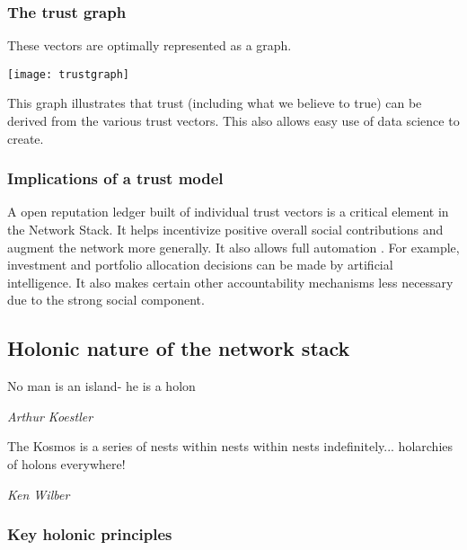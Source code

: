 \documentclass{article}
\begin{document}
\subsubsection{The trust graph}

These vectors are optimally represented as a graph.

\texttt{[image: trustgraph]}\cite{trustexchangegithub}


This graph illustrates that trust (including what we believe to true) can be derived from the various trust vectors. This also allows easy use of data science to create.


\subsubsection{Implications of a trust  model}

A open reputation ledger built of individual trust vectors is a critical element in the Network Stack. It helps incentivize positive overall social contributions and augment the network more generally.  It also allows full automation . For example, investment and portfolio allocation decisions can be made by artificial intelligence. It also makes certain other accountability mechanisms less necessary due to the strong social component.



\subsection {Holonic nature of the network stack}

\epigraph{No man is an island- he is a holon}{\textit{Arthur Koestler}\cite{koestlersleep}}

\epigraph{The Kosmos is a series of nests within nests within nests indefinitely... holarchies of holons everywhere!}{\textit{Ken Wilber}\cite{wilbereberything}
}

\subsubsection {Key holonic principles}
\end{document}
